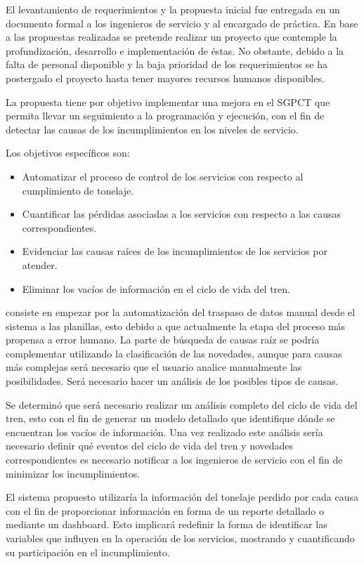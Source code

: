 \documentclass[oneside,12pt, letterpaper, titlepage]{book}
\begin{document}
El levantamiento de requerimientos y la propuesta inicial fue entregada en un documento formal a los ingenieros de servicio y al encargado de práctica. En base a las propuestas realizadas se pretende realizar un proyecto que contemple la profundización, desarrollo e implementación de éstas. No obstante, debido a la falta de personal disponible y la baja prioridad de los requerimientos se ha postergado el proyecto hasta tener mayores recursos humanos disponibles.

La propuesta tiene por objetivo implementar una mejora en el SGPCT que permita llevar un seguimiento a la programación y ejecución, con el fin de detectar las causas de los incumplimientos en los niveles de servicio. 

Los objetivos específicos son:
\begin{itemize}
\item Automatizar el proceso de control de los servicios con respecto al cumplimiento de tonelaje.
\item Cuantificar las pérdidas asociadas a los servicios con respecto a las causas correspondientes.
\item Evidenciar las causas raíces de los incumplimientos de los servicios por atender.
\item Eliminar los vacíos de información en el ciclo de vida del tren.
\end{itemize}

consiste en empezar por la automatización del traspaso de datos manual desde el sistema a las planillas, esto debido a que actualmente la etapa del proceso más propensa a error humano. La parte de búsqueda de causas raíz se podría complementar utilizando la clasificación de las novedades, aunque para causas más complejas será necesario que el usuario analice manualmente las posibilidades. Será necesario hacer un análisis de los posibles tipos de causas.

Se determinó que será necesario realizar un análisis completo del ciclo de vida del tren, esto con el fin de generar un modelo detallado que identifique dónde se encuentran los vacíos de información. Una vez realizado este análisis sería necesario definir qué eventos del ciclo de vida del tren y novedades correspondientes es necesario notificar a los ingenieros de servicio con el fin de minimizar los incumplimientos.

El sistema propuesto utilizaría la información del tonelaje perdido por cada causa con el fin de proporcionar información en forma de un reporte detallado o mediante un dashboard. Esto implicará redefinir la forma de identificar las variables que influyen en la operación de los servicios, mostrando y cuantificando su participación en el incumplimiento.
\end{document}
